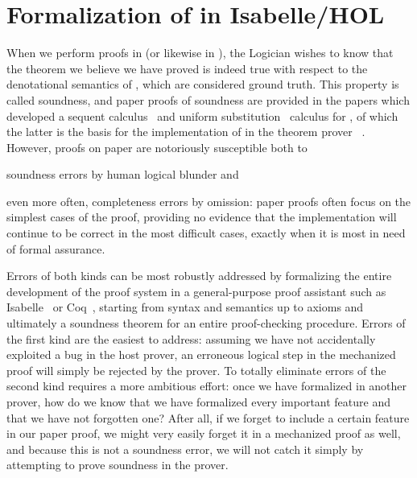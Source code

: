 \documentclass[12pt]{cmuthesis}
\theoremstyle{definition}
\theoremstyle{remark}
\newcommand{\Isabelle}{Isabelle/HOL\xspace}
\begin{document}
\section{Formalization of \dL in \Isabelle}
\label{sec:isabelle-fml}
When we perform proofs in \dL (or likewise in \dGL), the Logician wishes to know that the theorem we believe we have proved is indeed true with respect to the denotational semantics of \dL, which are considered ground truth.
This property is called soundness, and paper proofs of soundness are provided in the papers which developed a sequent calculus~\cite{DBLP:journals/jar/Platzer08} and uniform substitution~\cite{DBLP:journals/jar/Platzer17} calculus for \dL, of which the latter is the basis for the implementation of \dGL in the theorem prover \KeYmaeraX~\cite{DBLP:conf/cade/FultonMQVP15}.
However, proofs on paper are notoriously susceptible both to
\begin{inparaenum}[i)]
  \item soundness errors by human logical blunder and
  \item even more often, completeness errors by omission: 
    paper proofs often focus on the simplest cases of the proof, providing no evidence that the implementation will continue to be correct in the most difficult cases, exactly when it is most in need of formal assurance.
\end{inparaenum}
Errors of both kinds can be most robustly addressed by formalizing the entire development of the proof system in a general-purpose proof assistant such as Isabelle~\cite{DBLP:books/sp/NipkowPW02} or Coq~\cite{COQ}, starting from syntax and semantics up to axioms and ultimately a soundness theorem for an entire proof-checking procedure.
Errors of the first kind are the easiest to address: assuming we have not accidentally exploited a bug in the host prover, an erroneous logical step in the mechanized proof will simply be rejected by the prover.
To totally eliminate errors of the second kind requires a more ambitious effort: once we have formalized \dL in another prover, how do we know that we have formalized every important feature and that we have not forgotten one?
After all, if we forget to include a certain feature in our paper proof, we might very easily forget it in a mechanized proof as well, and because this is not a soundness error, we will not catch it simply by attempting to prove soundness in the prover.
\end{document}
